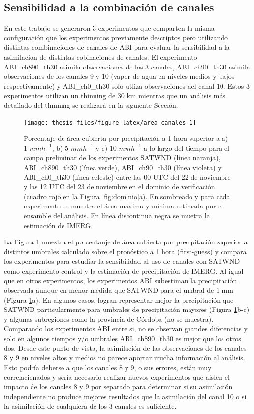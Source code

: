 \documentclass[12pt,oneside,a4paper]{reedthesis}
\begin{document}
\hypertarget{canales}{%
\subsection{Sensibilidad a la combinación de canales}\label{canales}}

En este trabajo se generaron 3 experimentos que comparten la misma configuración que los experimentos previamente descriptos pero utilizando distintas combinaciones de canales de ABI para evaluar la sensibilidad a la asimilación de distintas cobinaciones de canales. El experimento ABI\_ch890\_th30 asimila observaciones de los 3 canales, ABI\_ch90\_th30 asimila observaciones de los canales 9 y 10 (vapor de agua en niveles medios y bajos respectivamente) y ABI\_ch0\_th30 solo utliza observaciones del canal 10. Estos 3 experimentos utilizan un thinning de 30 km mientras que un análisis más detallado del thinning se realizará en la siguiente Sección.


\begin{figure}
\texttt{[image: thesis\_files/figure-latex/area-canales-1]} \caption{Porcentaje de área cubierta por precipitación a 1 hora superior a a) 1 \(mmh^{-1}\), b) 5 \(mmh^{-1}\) y c) 10 \(mmh^{-1}\) a lo largo del tiempo para el campo preliminar de los experimentos SATWND (línea naranja), ABI\_ch890\_th30 (línea verde), ABI\_ch90\_th30 (línea violeta) y ABI\_ch0\_th30 (línea celeste) entre las 00 UTC del 22 de noviembre y las 12 UTC del 23 de noviembre en el dominio de verificación (cuadro rojo en la Figura \ref{fig:dominio}a). En sombreado y para cada experimento se muestra el área máxima y mínima estimada por el ensamble del análisis. En línea discontinua negra se muetra la estimación de IMERG.}\label{fig:area-canales}
\end{figure}
La Figura \ref{fig:area-canales} muestra el porcentanje de área cubierta por precipitación superior a distintos umbrales calculado sobre el pronóstico a 1 hora (first-guess) y compara los experimentos para estudiar la sensibilidad al uso de canales con SATWND como experimento control y la estimación de precipitación de IMERG. Al igual que en otros experimentos, los experimentos ABI subestiman la precipitación observada aunque en menor medida que SATWND para el umbral de 1 mm (Figura \ref{fig:area-canales}a). En algunos casos, logran representar mejor la precipitación que SATWND particularmente para umbrales de precipitación mayores (Figura \ref{fig:area-canales}b-c) y algunas subregiones como la provincia de Córdoba (no se muestra). Comparando los experimentos ABI entre si, no se observan grandes diferencias y solo en algunos tiempos y/o umbrales ABI\_ch890\_th30 es mejor que los otros dos. Desde este punto de vista, la asimilación de las observaciones de los canales 8 y 9 en niveles altos y medios no parece aportar mucha información al análisis. Esto podría deberse a que los canales 8 y 9, o sus errores, están muy correlacionados y sería necesario realizar nuevos experimentos que aislen el impacto de los canales 8 y 9 por separado para determinar si su asimilación independiente no produce mejores resultados que la asimilación del canal 10 o si la asimilación de cualquiera de los 3 canales es suficiente.
\end{document}
